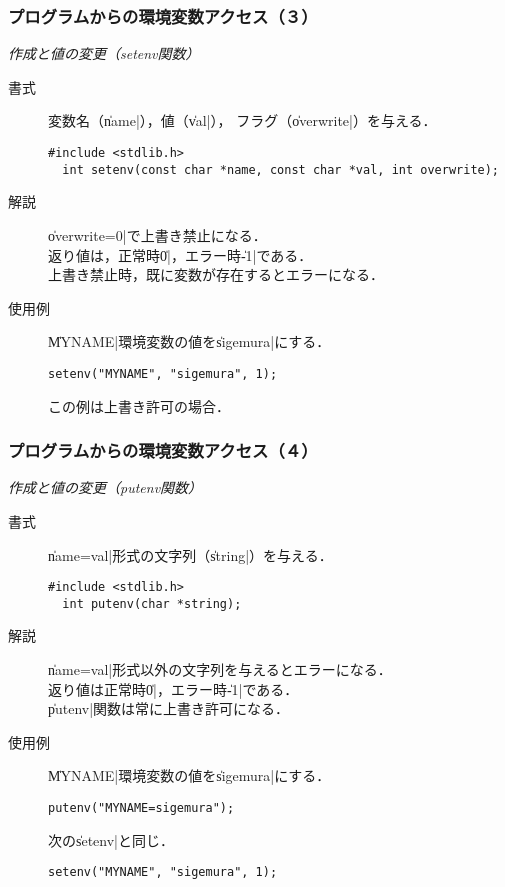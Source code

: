 \documentclass{beamer}                 %
\begin{document}
\begin{frame}[fragile]
  \frametitle{プログラムからの環境変数アクセス（３）}
  \emph{作成と値の変更（setenv関数）}
  \begin{description}
  \item [書式] 変数名（\|name|），値（\|val|），
    フラグ（\|overwrite|）を与える．
\begin{lstlisting}[numbers=none]
  #include <stdlib.h>
  int setenv(const char *name, const char *val, int overwrite);
\end{lstlisting}
  \item [解説] \|overwrite=0|で上書き禁止になる．\\
    返り値は，正常時\|0|，エラー時\|-1|である．\\
    上書き禁止時，既に変数が存在するとエラーになる．
  \item [使用例] \|MYNAME|環境変数の値を\|sigemura|にする．
\begin{lstlisting}[numbers=none]
  setenv("MYNAME", "sigemura", 1);
\end{lstlisting}
    この例は上書き許可の場合．
  \end{description}
  \vfill
\end{frame}

\begin{frame}[fragile]
  \frametitle{プログラムからの環境変数アクセス（４）}
  \emph{作成と値の変更（putenv関数）}
  \begin{description}
  \item [書式] \|name=val|形式の文字列（\|string|）を与える．
\begin{lstlisting}[numbers=none]
  #include <stdlib.h>
  int putenv(char *string);
\end{lstlisting}
  \item [解説] \|name=val|形式以外の文字列を与えるとエラーになる．\\
    返り値は正常時\|0|，エラー時\|-1|である．\\
    \|putenv|関数は常に上書き許可になる．
  \item [使用例] \|MYNAME|環境変数の値を\|sigemura|にする．
\begin{lstlisting}[numbers=none]
  putenv("MYNAME=sigemura");
\end{lstlisting}
    次の\|setenv|と同じ．
\begin{lstlisting}[numbers=none]
  setenv("MYNAME", "sigemura", 1);
\end{lstlisting}
  \end{description}
  \vfill
\end{frame}
\end{document}
